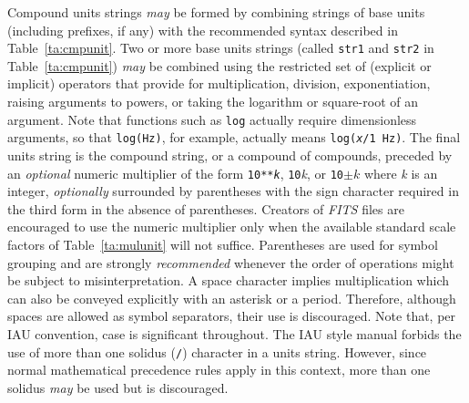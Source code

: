 \documentclass[11pt,makeidx]{book}     %
\begin{document}
Compound units strings {\em may} be formed by combining strings of base 
units (including prefixes, if any) with the recommended syntax 
described in Table~\ref{ta:cmpunit}. Two or more base units strings 
(called {\tt str1} and {\tt str2} in Table~\ref{ta:cmpunit}) {\em may} be combined using 
the restricted set of (explicit or implicit) operators that provide for 
multiplication, division, exponentiation, raising arguments to powers, 
or taking the logarithm or square-root of an argument. 
%
Note that functions such as {\tt log} actually require dimensionless 
arguments, so that {\tt log(Hz)}, for example, actually means 
{\tt log({\it x}/1~Hz)}.  The final units string is the compound string, or 
a compound of compounds, preceded by an {\em optional} numeric multiplier 
of the form {\tt 10**{\it k}}, {\tt 10}\^{\it k}, or {\tt 10}$\pm k$ where {\it k} is
an integer, {\em optionally} surrounded by parentheses with the sign
character required in the third form in the absence of parentheses. 
Creators of {\em FITS\/} files are encouraged to use the numeric multiplier 
only when the available standard scale factors of Table~\ref{ta:mulunit} 
will not suffice. 
Parentheses are used for symbol grouping and are strongly
{\em recommended} whenever the order of operations might be subject to
misinterpretation. A space character implies multiplication which can
also be conveyed explicitly with an asterisk or a period. 
%
Therefore, although spaces are allowed as symbol separators, 
their use is discouraged. 
Note that, per IAU convention, case is significant  throughout. 
The IAU style manual forbids the use of more than one solidus 
({\tt /}) character in a units string. However, since normal mathematical 
precedence rules apply in this context, more than one solidus 
{\em may} be used but is discouraged.  
\end{document}
